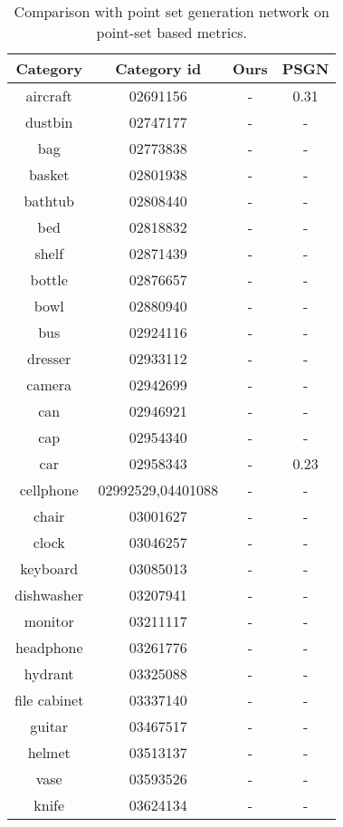 \begin{table*}
	\centering
	\caption{Comparison with point set generation network on point-set based metrics. }
	\begin{tabular}{c c c c}
		Category & Category id & Ours & PSGN\cite{PSGN} \\
		\hline
		aircraft & 02691156 &- & 0.31\\   
		dustbin & 02747177 &- & -\\
		bag & 02773838  &- &  -\\
		basket & 02801938 &- & -\\
		bathtub & 02808440 &- & -\\
		bed & 02818832 & - & -\\
		shelf & 02871439 &- & -\\
		bottle & 02876657 &- & -\\
		bowl & 02880940 &- & -\\
		bus & 02924116 &- & -\\
		dresser & 02933112 &- & -\\
		camera & 02942699 &- & -\\
		can & 02946921 &- & -\\
		cap & 02954340 &- & -\\
		car & 02958343 &- & 0.23\\
		cellphone & 02992529,04401088 & - & -\\
		chair & 03001627 & - & -\\
		clock & 03046257 & - & -\\
		keyboard & 03085013 & - & -\\
		dishwasher & 03207941 & - & -\\
		monitor & 03211117 & - & -\\
		headphone & 03261776 & - & -\\
		hydrant & 03325088 & - & -\\
		file cabinet& 03337140 & - & -\\
		guitar & 03467517 & - & -\\
		helmet & 03513137 & - & -\\
		vase & 03593526 & -& -\\
		knife & 03624134 & - &-\\

\end{tabular}
\end{table*}
